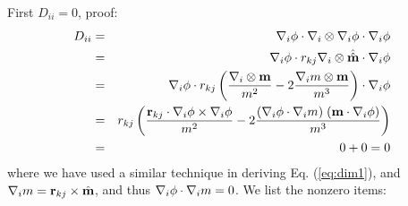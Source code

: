 \documentclass{article}
\begin{document}
First $D_{ii} = 0$, proof:
\begin{eqnarray*}
D_{ii}
&=& \nabla_i \phi \cdot \nabla_i \otimes \nabla_i \phi \cdot \nabla_i \phi \\
&=& \nabla_i \phi \cdot r_{kj} \nabla_i \otimes \hat{\hat{\mathbf{m}}} \cdot \nabla_i \phi \\
&=& \nabla_i \phi \cdot r_{kj}
    \left(
    \frac {\nabla_i \otimes \mathbf{m}} {m^2}
    - 2 \frac{\nabla_i m \otimes \mathbf{m}}{m^3}
    \right)
  \cdot \nabla_i \phi \\
&=& r_{kj} \left(
    \frac {\mathbf{r}_{kj} \cdot \nabla_i \phi \times \nabla_i \phi} {m^2}
    - 2 \frac{(\nabla_i \phi \cdot \nabla_i m) \; (\mathbf{m} \cdot \nabla_i \phi)}{m^3}
    \right) \\
&=& 0 + 0 = 0
\end{eqnarray*}
where we have used a similar technique in deriving Eq. (\ref{eq:dim1}),
and $\nabla_i m = \mathbf{r}_{kj} \times \hat{\mathbf{m}}$,
and thus $\nabla_i \phi \cdot \nabla_i m = 0$.
We list the nonzero items:
\end{document}
